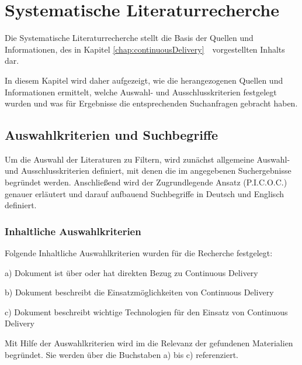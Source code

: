 \chapter{Systematische Literaturrecherche}
\label{chap:sysRecherche}
Die Systematische Literaturrecherche stellt die Basis der Quellen und Informationen, des in Kapitel \ref{chap:continuousDelivery}\ \ vorgestellten Inhalts dar.

In diesem Kapitel wird daher aufgezeigt, wie die herangezogenen Quellen und Informationen ermittelt, welche Auswahl- und Ausschlusskriterien festgelegt wurden und was für Ergebnisse die entsprechenden Suchanfragen gebracht haben.

\section{Auswahlkriterien und Suchbegriffe}
\label{sec:auswahlkriterienUndSuchbegriffe}
Um die Auswahl der Literaturen zu Filtern, wird zunächst allgemeine Auswahl- und Ausschlusskriterien definiert, mit denen die im  angegebenen Suchergebnisse begründet werden.
Anschließend wird der Zugrundlegende Ansatz (P.I.C.O.C.) genauer erläutert und darauf aufbauend Suchbegriffe in Deutsch und Englisch definiert.

\subsection{Inhaltliche Auswahlkriterien}
\label{subsec:inhaltlicheAuswahlkriterien}
Folgende Inhaltliche Auswahlkriterien wurden für die Recherche festgelegt:
\begin{list}{label}{spacing}
	\item[a)] Dokument ist über oder hat direkten Bezug zu Continuous Delivery
	\item[b)] Dokument beschreibt die Einsatzmöglichkeiten von Continuous Delivery
	\item[c)] Dokument beschreibt wichtige Technologien für den Einsatz von Continuous Delivery
\end{list}
Mit Hilfe der Auswahlkriterien wird im  die Relevanz der gefundenen Materialien begründet. Sie werden über die Buchstaben a) bis c) referenziert.
